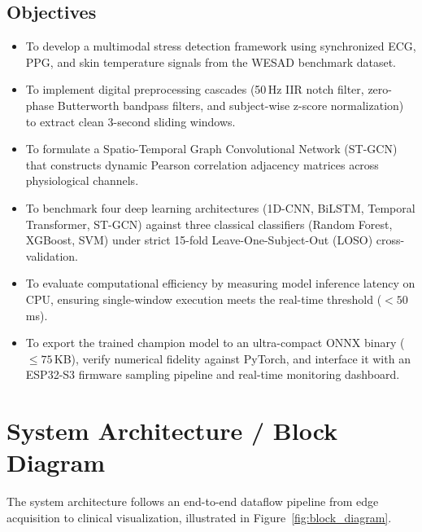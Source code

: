 \documentclass[11pt,a4paper]{article}
\begin{document}
\subsection{Objectives}
\begin{itemize}
    \item To develop a multimodal stress detection framework using synchronized ECG, PPG, and skin temperature signals from the WESAD benchmark dataset.
    \item To implement digital preprocessing cascades (50\,Hz IIR notch filter, zero-phase Butterworth bandpass filters, and subject-wise z-score normalization) to extract clean 3-second sliding windows.
    \item To formulate a Spatio-Temporal Graph Convolutional Network (ST-GCN) that constructs dynamic Pearson correlation adjacency matrices across physiological channels.
    \item To benchmark four deep learning architectures (1D-CNN, BiLSTM, Temporal Transformer, ST-GCN) against three classical classifiers (Random Forest, XGBoost, SVM) under strict 15-fold Leave-One-Subject-Out (LOSO) cross-validation.
    \item To evaluate computational efficiency by measuring model inference latency on CPU, ensuring single-window execution meets the real-time threshold ($< 50$\,ms).
    \item To export the trained champion model to an ultra-compact ONNX binary ($\le 75$\,KB), verify numerical fidelity against PyTorch, and interface it with an ESP32-S3 firmware sampling pipeline and real-time monitoring dashboard.
\end{itemize}

\section{System Architecture / Block Diagram}

The system architecture follows an end-to-end dataflow pipeline from edge acquisition to clinical visualization, illustrated in Figure~\ref{fig:block_diagram}.
\end{document}

